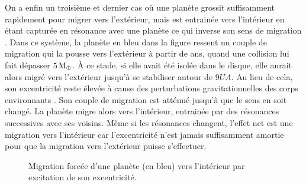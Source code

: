 \bigskip

On a enfin un troisième et dernier cas où une planète grossit suffisamment rapidement pour migrer vers l'extérieur, mais est entrainée vers l'intérieur en étant capturée en résonance avec une planète ce qui inverse son sens de migration . Dans ce système, la planète en bleu dans la figure ressent un couple de migration qui la pousse vers l'extérieur à partir de  ans, quand une collision lui fait dépasser $5\mathrm{\thinspace M_\oplus}$. À ce stade, si elle avait été isolée dans le disque, elle aurait alors migré vers l'extérieur jusqu'à se stabiliser autour de $9\unit{UA}$. Au lieu de cela, son excentricité reste élevée à cause des perturbations gravitationnelles des corps environnants . Son couple de migration est atténué jusqu'à que le sens en soit changé. La planète migre alors vers l'intérieur, entrainée par des résonances successives avec ses voisins. Même si les résonances changent, l'effet net est une migration vers l'intérieur car l'excentricité n'est jamais suffisamment amortie pour que la migration vers l'extérieur puisse s'effectuer.

\begin{figure}[htbp]
\centering
{}\hfill
{}
\caption{Migration forcée d'une planète (en bleu) vers l'intérieur par excitation de son excentricité.}\label{fig:HSE_forced_in}
\end{figure}%

